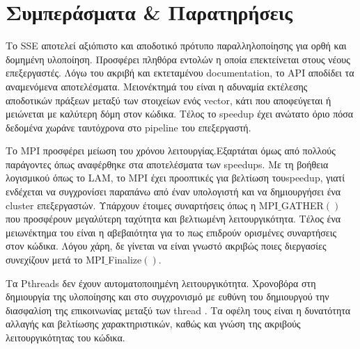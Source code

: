 \documentclass[11pt]{article}
\begin{document}
\section{Συμπεράσματα \& Παρατηρήσεις}
\hspace{8mm}Το SSE αποτελεί αξιόπιστο και αποδοτικό πρότυπο παραλληλοποίησης για ορθή και δομημένη υλοποίηση. Προσφέρει πληθόρα εντολών η οποία επεκτείνεται στους νέους επεξεργαστές. Λόγω του ακριβή και εκτεταμένου documentation, το API αποδίδει τα αναμενόμενα αποτελέσματα. Μειονέκτημά του είναι η αδυναμία εκτέλεσης αποδοτικών πράξεων μεταξύ των στοιχείων ενός vector, κάτι που αποφεύγεται ή μειώνεται με καλύτερη δόμη στον κώδικα. Τέλος το speedup έχει ανώτατο όριο πόσα δεδομένα χωράνε ταυτόχρονα στο pipeline του επεξεργαστή. 

Το MPI προσφέρει μείωση του χρόνου λειτουργίας.Εξαρτάται όμως από πολλούς παράγοντες όπως αναφέρθηκε στα αποτελέσματα των speedups. Με τη βοήθεια λογισμικού όπως το LAM, το MPI έχει προοπτικές για βελτίωση τουspeedup, γιατί ενδέχεται να συγχρονίσει παραπάνω από έναν υπολογιστή και να δημιουργήσει ένα cluster επεξεργαστών. Υπάρχουν έτοιμες συναρτήσεις όπως η MPI$\_$GATHER$()$ που προσφέρουν μεγαλύτερη ταχύτητα και  βελτιωμένη λειτουργικότητα. Τέλος ένα μειωνέκτημα του είναι η αβεβαιότητα για το πως επιδρούν ορισμένες συναρτήσεις στον κώδικα. Λόγου χάρη, δε γίνεται να είναι γνωστό ακριβώς ποιες διεργασίες συνεχίζουν μετά το MPI$\_$Finalize$()$.

 Τα Pthreads δεν έχουν αυτοματοποιημένη λειτουργικότητα. Χρονοβόρα στη δημιουργία της υλοποίησης και στο συγχρονισμό με ευθύνη του δημιουργού την διασφαλίση της επικοινωνίας μεταξύ των thread . Τα οφέλη τους είναι η δυνατότητα αλλαγής και βελτίωσης χαρακτηριστικών, καθώς και γνώση της ακριβούς λειτουργικότητας του κώδικα. 
 
\end{document}
